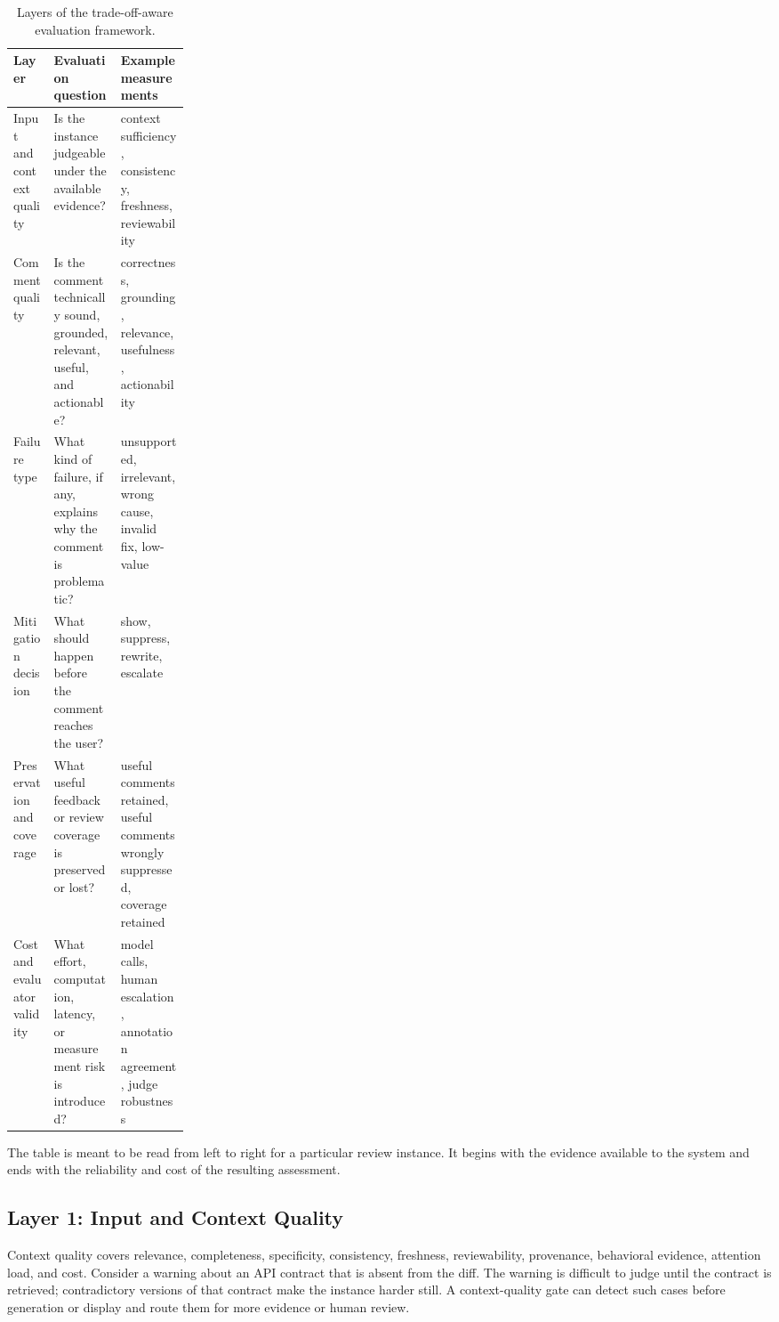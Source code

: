 \documentclass[10pt]{article}
\begin{document}
\begin{table}[H]
\centering
\caption{Layers of the trade-off-aware evaluation framework.}
\label{tab:framework-layers}
\footnotesize
\renewcommand{\arraystretch}{1.18}
\begin{tabularx}{\linewidth}{@{}>{\raggedright\arraybackslash}p{0.23\linewidth}>{\raggedright\arraybackslash}X>{\raggedright\arraybackslash}X@{}}
\toprule
\rowcolor{ACMTableHead}
\textbf{Layer} & \textbf{Evaluation question} & \textbf{Example measurements} \\
\midrule
Input and context quality & Is the instance judgeable under the available evidence? & context sufficiency, consistency, freshness, reviewability \\
Comment quality & Is the comment technically sound, grounded, relevant, useful, and actionable? & correctness, grounding, relevance, usefulness, actionability \\
Failure type & What kind of failure, if any, explains why the comment is problematic? & unsupported, irrelevant, wrong cause, invalid fix, low-value \\
Mitigation decision & What should happen before the comment reaches the user? & show, suppress, rewrite, escalate \\
Preservation and coverage & What useful feedback or review coverage is preserved or lost? & useful comments retained, useful comments wrongly suppressed, coverage retained \\
Cost and evaluator validity & What effort, computation, latency, or measurement risk is introduced? & model calls, human escalation, annotation agreement, judge robustness \\
\bottomrule
\end{tabularx}
\end{table}

The table is meant to be read from left to right for a particular review instance. It begins with the evidence available to the system and ends with the reliability and cost of the resulting assessment.

\subsection{Layer 1: Input and Context Quality}

Context quality covers relevance, completeness, specificity, consistency, freshness, reviewability, provenance, behavioral evidence, attention load, and cost. Consider a warning about an API contract that is absent from the diff. The warning is difficult to judge until the contract is retrieved; contradictory versions of that contract make the instance harder still. A context-quality gate can detect such cases before generation or display and route them for more evidence or human review.
\end{document}
